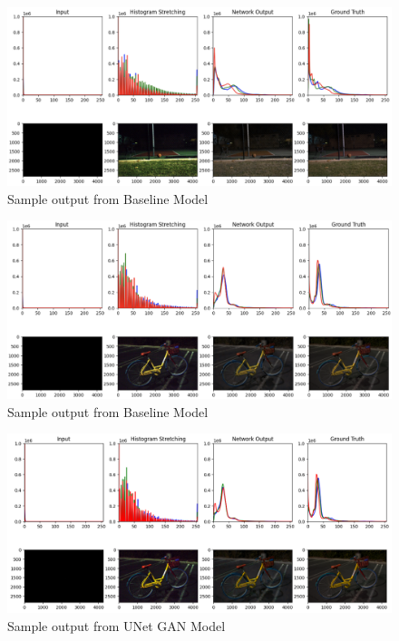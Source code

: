 \documentclass{article}
\begin{document}
\begin{figure}[H]
  \centering
  \includegraphics[width=\textwidth]{Result1Unet1.png}
  \caption{Sample output from Baseline Model}
\end{figure}
\begin{figure}[H]
  \centering
  \includegraphics[width=\textwidth]{Result2Unet1.png}
  \caption{Sample output from Baseline Model}
\end{figure}
\begin{figure}[H]
  \centering
  \includegraphics[width=\textwidth]{Result1UnetGAN.png}
  \caption{Sample output from UNet GAN Model}
\end{figure}
\end{document}
